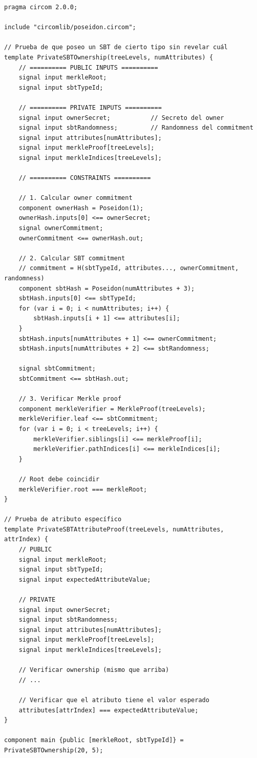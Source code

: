 \documentclass[11pt,a4paper,twoside]{book}
\theoremstyle{definition}
\theoremstyle{remark}
\begin{document}
\begin{lstlisting}[language=circom, caption={Circuito para prueba de posesión de SBT privado}]
pragma circom 2.0.0;

include "circomlib/poseidon.circom";

// Prueba de que poseo un SBT de cierto tipo sin revelar cuál
template PrivateSBTOwnership(treeLevels, numAttributes) {
    // ========== PUBLIC INPUTS ==========
    signal input merkleRoot;
    signal input sbtTypeId;
    
    // ========== PRIVATE INPUTS ==========
    signal input ownerSecret;           // Secreto del owner
    signal input sbtRandomness;         // Randomness del commitment
    signal input attributes[numAttributes];
    signal input merkleProof[treeLevels];
    signal input merkleIndices[treeLevels];
    
    // ========== CONSTRAINTS ==========
    
    // 1. Calcular owner commitment
    component ownerHash = Poseidon(1);
    ownerHash.inputs[0] <== ownerSecret;
    signal ownerCommitment;
    ownerCommitment <== ownerHash.out;
    
    // 2. Calcular SBT commitment
    // commitment = H(sbtTypeId, attributes..., ownerCommitment, randomness)
    component sbtHash = Poseidon(numAttributes + 3);
    sbtHash.inputs[0] <== sbtTypeId;
    for (var i = 0; i < numAttributes; i++) {
        sbtHash.inputs[i + 1] <== attributes[i];
    }
    sbtHash.inputs[numAttributes + 1] <== ownerCommitment;
    sbtHash.inputs[numAttributes + 2] <== sbtRandomness;
    
    signal sbtCommitment;
    sbtCommitment <== sbtHash.out;
    
    // 3. Verificar Merkle proof
    component merkleVerifier = MerkleProof(treeLevels);
    merkleVerifier.leaf <== sbtCommitment;
    for (var i = 0; i < treeLevels; i++) {
        merkleVerifier.siblings[i] <== merkleProof[i];
        merkleVerifier.pathIndices[i] <== merkleIndices[i];
    }
    
    // Root debe coincidir
    merkleVerifier.root === merkleRoot;
}

// Prueba de atributo específico
template PrivateSBTAttributeProof(treeLevels, numAttributes, attrIndex) {
    // PUBLIC
    signal input merkleRoot;
    signal input sbtTypeId;
    signal input expectedAttributeValue;
    
    // PRIVATE
    signal input ownerSecret;
    signal input sbtRandomness;
    signal input attributes[numAttributes];
    signal input merkleProof[treeLevels];
    signal input merkleIndices[treeLevels];
    
    // Verificar ownership (mismo que arriba)
    // ...
    
    // Verificar que el atributo tiene el valor esperado
    attributes[attrIndex] === expectedAttributeValue;
}

component main {public [merkleRoot, sbtTypeId]} = PrivateSBTOwnership(20, 5);
\end{lstlisting}
\end{document}
